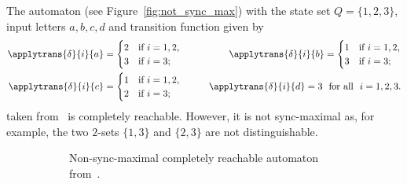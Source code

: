 \begin{example}
	\label{ex:compl_reachable_not_sync_max}
	The automaton (see Figure~\ref{fig:not_sync_max})
	with the state set $Q= \{1,2,3\}$, input letters $a, b, c, d$
	and transition function
	given by
	\begin{eqnarray*}
		\applytrans{\delta}{i}{a} = \begin{cases}
			2 &\text{if } i=1,2,\\
			3 &\text{if } i=3;
		\end{cases}
		&\qquad&
		\applytrans{\delta}{i}{b} =\begin{cases}
			1 &\text{if } i=1,2,\\
			3 &\text{if } i=3;
		\end{cases}
		\\
		\applytrans{\delta}{i}{c}=\begin{cases}
			1 &\text{if } i=1,2,\\
			2 &\text{if } i=3;
		\end{cases}
		&\qquad&
		\applytrans{\delta}{i}{d}=3\ \text{ for all }\ i=1,2,3.
	\end{eqnarray*}
	taken from~\cite[Ex.~2]{BondarV16} is completely reachable.
	However, it is not sync-maximal
	as, for example, the two $2$-sets $\{1,3\}$ 
	and $\{2,3\}$ are not distinguishable.
	\begin{figure}[ht]
		\begin{subfigure}[t]{0.31\textwidth}
			\centering 
			\caption{Non-sync-maximal completely reachable automaton from~\cite[Ex.~2]{BondarV16}.}
		\end{subfigure}\hfill%
		\begin{subfigure}[t]{0.31\textwidth}
			\centering 
			\scalebox{.9}{\begin{tikzpicture}[shorten >=1pt,->,node distance=2.5cm and 0.65cm]
					

\end{tikzpicture}}
\end{subfigure}
\end{figure}
\end{example}
